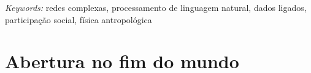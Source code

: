 \documentclass[a4paper, 11pt]{article} %
\begin{document}
\hspace*{3,6mm}\textit{Keywords:} redes complexas, processamento de linguagem natural, dados ligados, participação social, física antropológica %


\newpage
\tableofcontents


\section*{Abertura no fim do mundo}
\end{document}

